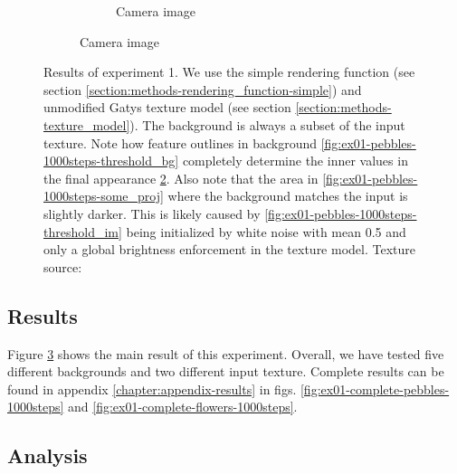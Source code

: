 \begin{figure}[]
\begin{subfigure}{\textwidth}
\begin{subfigure}{0.24\textwidth}
            \caption{Camera image}
            \label{fig:ex01-pebbles-1000steps-threshold_proj}
        \end{subfigure}
    \end{subfigure}
    \caption{Results of experiment 1. We use the simple rendering function (see section \ref{section:methods-rendering_function-simple}) and unmodified Gatys texture model (see section \ref{section:methods-texture_model}). The background is always a subset of the input texture. Note how feature outlines in background \ref{fig:ex01-pebbles-1000steps-threshold_bg} completely determine the inner values in the final appearance \ref{fig:ex01-pebbles-1000steps-threshold_proj}. Also note that the area in \ref{fig:ex01-pebbles-1000steps-some_proj} where the background matches the input is slightly darker. This is likely caused by \ref{fig:ex01-pebbles-1000steps-threshold_im} being initialized by white noise with mean 0.5 and only a global brightness enforcement in the texture model. Texture source: \citet{Gatys2015}}
    \label{fig:ex01-pebbles-1000steps}
\end{figure}

\subsection{Results}
\label{section:results-experiments-01-results}

Figure \ref{fig:ex01-pebbles-1000steps} shows the main result of this experiment. Overall, we have tested five different backgrounds and two different input texture. Complete results can be found in appendix \ref{chapter:appendix-results} in figs. \ref{fig:ex01-complete-pebbles-1000steps} and \ref{fig:ex01-complete-flowers-1000steps}.

\subsection{Analysis}
\label{section:results-experiments-01-analysis}

